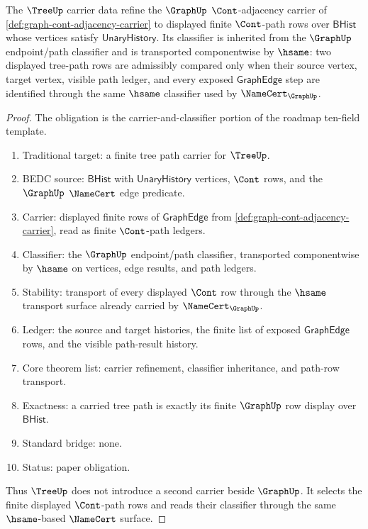 \begin{theorem}
\label{thm:tree-obligation-carrier-classifier}
The $\TreeUp$ carrier data refine the $\GraphUp$ $\Cont$-adjacency carrier of
\autoref{def:graph-cont-adjacency-carrier} to displayed finite $\Cont$-path
rows over $\mathsf{BHist}$ whose vertices satisfy $\mathsf{UnaryHistory}$. Its
classifier is inherited from the $\GraphUp$ endpoint/path classifier and is
transported componentwise by $\hsame$: two displayed tree-path rows are
admissibly compared only when their source vertex, target vertex, visible path
ledger, and every exposed $\mathsf{GraphEdge}$ step are identified through the
same $\hsame$ classifier used by $\NameCert_{\GraphUp}$.
\end{theorem}
\begin{proof}
The obligation is the carrier-and-classifier portion of the roadmap ten-field
template.
\begin{enumerate}
  \item Traditional target: a finite tree path carrier for $\TreeUp$.
  \item BEDC source: $\mathsf{BHist}$ with $\mathsf{UnaryHistory}$ vertices,
  $\Cont$ rows, and the $\GraphUp$ $\NameCert$ edge predicate.
  \item Carrier: displayed finite rows of $\mathsf{GraphEdge}$ from
  \autoref{def:graph-cont-adjacency-carrier}, read as finite $\Cont$-path
  ledgers.
  \item Classifier: the $\GraphUp$ endpoint/path classifier, transported
  componentwise by $\hsame$ on vertices, edge results, and path ledgers.
  \item Stability: transport of every displayed $\Cont$ row through the
  $\hsame$ transport surface already carried by $\NameCert_{\GraphUp}$.
  \item Ledger: the source and target histories, the finite list of exposed
  $\mathsf{GraphEdge}$ rows, and the visible path-result history.
  \item Core theorem list: carrier refinement, classifier inheritance, and
  path-row transport.
  \item Exactness: a carried tree path is exactly its finite $\GraphUp$ row
  display over $\mathsf{BHist}$.
  \item Standard bridge: none.
  \item Status: paper obligation.
\end{enumerate}

Thus $\TreeUp$ does not introduce a second carrier beside $\GraphUp$. It
selects the finite displayed $\Cont$-path rows and reads their classifier
through the same $\hsame$-based $\NameCert$ surface.
\end{proof}

